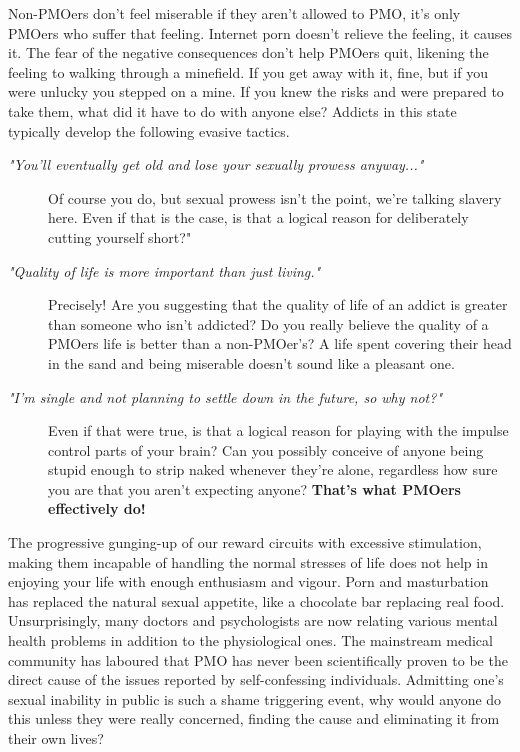 \documentclass[easypeasy.tex]{subfiles}
\begin{document}
Non-PMOers don't feel miserable if they aren't allowed to PMO, it's only PMOers who suffer that feeling. Internet porn doesn't relieve the feeling, it causes it. The fear of the negative consequences don't help PMOers quit, likening the feeling to walking through a minefield. If you get away with it, fine, but if you were unlucky you stepped on a mine. If you knew the risks and were prepared to take them, what did it have to do with anyone else? Addicts in this state typically develop the following evasive tactics.
\begin{description}
  \item [\textit{"You'll eventually get old and lose your sexually prowess anyway..."}] Of course you do, but sexual prowess isn't the point, we're talking slavery here. Even if that is the case, is that a logical reason for deliberately cutting yourself short?"

  \item  [ \textit{"Quality of life is more important than just living."}] Precisely! Are you suggesting that the quality of life of an addict is greater than someone who isn't addicted? Do you really believe the quality of a PMOers life is better than a non-PMOer's? A life spent covering their head in the sand and being miserable doesn't sound like a pleasant one.

  \item [\textit{"I'm single and not planning to settle down in the future, so why not?"}] Even if that were true, is that a logical reason for playing with the impulse control parts of your brain? Can you possibly conceive of anyone being stupid enough to strip naked whenever they're alone, regardless how sure you are that you aren't expecting anyone? \textbf{That's what PMOers effectively do!}
\end{description}

The progressive gunging-up of our reward circuits with excessive stimulation, making them incapable of handling the normal stresses of life does not help in enjoying your life with enough enthusiasm and vigour. Porn and masturbation has replaced the natural sexual appetite, like a chocolate bar replacing real food. Unsurprisingly, many doctors and psychologists are now relating various mental health problems in addition to the physiological ones. The mainstream medical community has laboured that PMO has never been scientifically proven to be the direct cause of the issues reported by self-confessing individuals. Admitting one's sexual inability in public is such a shame triggering event, why would anyone do this unless they were really concerned, finding the cause and eliminating it from their own lives?
\end{document}
